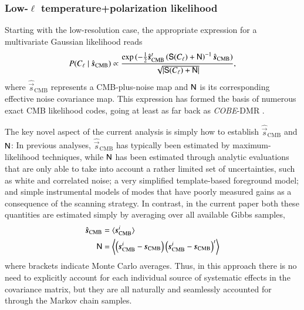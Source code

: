 \documentclass[onecolumn]{aa}
\newcommand{\s}[0]{\vec{s}}
\newcommand{\N}[0]{\tens{N}}
\renewcommand{\S}[0]{\tens{S}}
\begin{document}
\subsubsection{Low-$\ell$ temperature+polarization likelihood}

Starting with the low-resolution case, the appropriate expression for
a multivariate Gaussian likelihood reads
\begin{equation}
  \label{eq:gauss_like}
  P(C_\ell\mid\hat{\s}_{\mathrm{CMB}}) \propto \frac{\exp{(-\frac{1}{2}\hat{\s}_{\mathrm{CMB}}^t
  \left( \S(C_\ell)+\N \right)^{-1}\hat{\s}_{\mathrm{CMB}}})}{\sqrt{|\S(C_\ell)+\N|}},
\end{equation}
where $\hat{\s}_{\mathrm{CMB}}$ represents a CMB-plus-noise map and
$\N$ is its corresponding effective noise covariance map. This
expression has formed the basis of numerous exact CMB likelihood
codes, going at least as far back as \emph{COBE}-DMR
\citep[e.g.,][]{gorski:1994}.

The key novel aspect of the current analysis is simply how to
establish $\hat{\s}_{\mathrm{CMB}}$ and $\N$: In previous analyses,
$\hat{\s}_{\mathrm{CMB}}$ has typically been estimated by
maximum-likelihood techniques, while $\N$ has been estimated through
analytic evaluations that are only able to take into account a rather
limited set of uncertainties, such as white and correlated noise; a
very simplified template-based foreground model; and simple
instrumental models of modes that have poorly measured gains as a consequence 
of the scanning strategy. In contrast, in the current paper both these
quantities are estimated simply by averaging over all available Gibbs
samples,
\begin{align}
  \hat{\s}_{\mathrm{CMB}} &= \langle\s^i_{\mathrm{CMB}}\rangle \\
  \N &= \left\langle\left( \s^i_{\mathrm{CMB}}-\s_{\mathrm{CMB}} \right)
  \left( \s^i_{\mathrm{CMB}}-\s_{\mathrm{CMB}} \right)^t\right\rangle
  \label{eq:postmean}
\end{align}
where brackets indicate Monte Carlo averages. Thus, in this approach
there is no need to explicitly account for each individual source of
systematic effects in the covariance matrix, but they are all
naturally and seamlessly accounted for through the Markov chain
samples.
\end{document}
